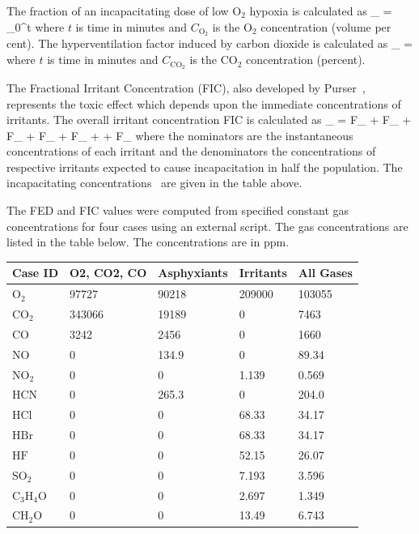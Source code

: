 \documentclass[11pt]{book}
\begin{document}
The fraction of an incapacitating dose of low O${}_2$ hypoxia is calculated as
\be
{}_ =  \int_0^t 
\ee
where $t$ is time in minutes and $C_\mathrm{O_2}$ is the O${}_2$ concentration (volume per cent).
The hyperventilation factor induced by carbon dioxide is calculated as
\be
{}_ =  \label{co2hyp}
\ee
where $t$ is time in minutes and $C_\mathrm{CO_2}$ is the CO${}_2$ concentration (percent).

The Fractional Irritant Concentration (FIC), also developed by Purser~\cite{SFPE:Purser}, represents the toxic effect which
depends upon the immediate concentrations of irritants. The overall irritant concentration FIC is calculated as
\be
{}_ =
        {F_} +
        {F_} +
         {F_} +
       {F_} +
       {F_} +
     +
      {F_}
\ee
where the nominators are the instantaneous concentrations of each irritant and the denominators the concentrations of respective irritants
expected to cause incapacitation in half the population. The incapacitating concentrations~\cite{SFPE:Purser} are given in the table above.

The FED and FIC values were computed from specified constant gas concentrations for four cases using an external script.
The gas concentrations are listed in the table below. The concentrations are in ppm.
\begin{center}
\begin{tabular}{|l|l|l|l|l|}
\hline Case ID & O2, CO2, CO & Asphyxiants & Irritants & All Gases \\ \hline \hline
$\mathrm{O_2}$ & 97727 & 90218 & 209000 & 103055 \\ \hline
$\mathrm{CO_2}$ & 343066 & 19189 & 0 & 7463 \\ \hline
$\mathrm{CO}$ & 3242 & 2456 & 0 & 1660 \\ \hline
$\mathrm{NO}$ & 0 & 134.9 & 0 & 89.34 \\ \hline
$\mathrm{NO_2}$ & 0 & 0 & 1.139 & 0.569 \\ \hline
$\mathrm{HCN}$ & 0 & 265.3 & 0 & 204.0 \\ \hline
$\mathrm{HCl}$ & 0 & 0 & 68.33 & 34.17 \\ \hline
$\mathrm{HBr}$ & 0 & 0 & 68.33 & 34.17 \\ \hline
$\mathrm{HF}$ & 0 & 0 & 52.15 & 26.07 \\ \hline
$\mathrm{SO_2}$ & 0 & 0 & 7.193 & 3.596 \\ \hline
$\mathrm{C_3H_4O}$ & 0 & 0 & 2.697 & 1.349 \\ \hline
$\mathrm{CH_2O}$ & 0 & 0 & 13.49 & 6.743  \\ \hline
\end{tabular}
\end{center}
\end{document}
